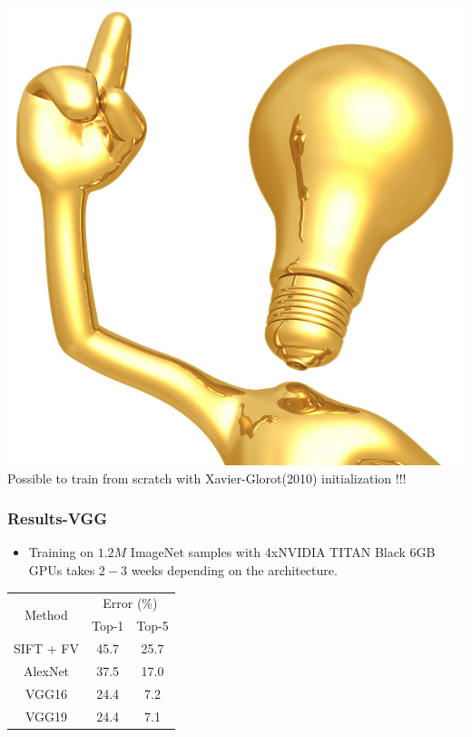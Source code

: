 \documentclass[9pt]{beamer}
\begin{document}
\begin{frame}
		\includegraphics[scale=0.01]{./figures/edit/eureka-min.jpg}  \hspace{0.5em}Possible to train from scratch with Xavier-Glorot(2010) initialization !!!	
\end{frame}

\begin{frame}
	\frametitle{Results-VGG}
		\begin{itemize}
			\item Training on $1.2M$ ImageNet samples with 4xNVIDIA TITAN Black 6GB GPUs takes $2-3$ weeks depending on the architecture.
		\end{itemize}	
		\begin{table}[]
		\centering
		\label{my-label}
		\begin{tabular}{|c|c|c|}
		\hline
		\multirow{2}{*}{Method} & \multicolumn{2}{c|}{Error (\%)} \\ \cline{2-3} 
		 & Top-1 & Top-5 \\ \hline
		SIFT + FV & 45.7 & 25.7 \\ \hline
		AlexNet & 37.5 & 17.0 \\ \hline
		VGG16 & 24.4 & 7.2 \\ \hline
		VGG19 & 24.4 & 7.1 \\ \hline
		\end{tabular}
		\end{table}
\end{frame}
\end{document}

